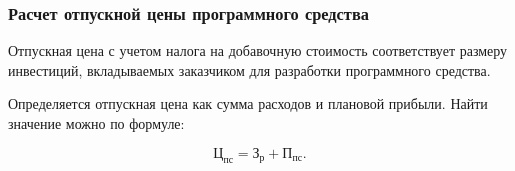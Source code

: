 
\subsubsection{Расчет отпускной цены программного средства}

Отпускная цена с учетом налога на добавочную стоимость соответствует размеру
инвестиций, вкладываемых заказчиком для разработки программного средства.

Определяется отпускная цена как сумма расходов и плановой прибыли.
Найти значение можно по формуле:

\begin{equation}
  \label{eq:econ:TsPs}
  \text{Ц}_\text{пс} = \text{З}_\text{р} + \text{П}_\text{пс}.
\end{equation}



